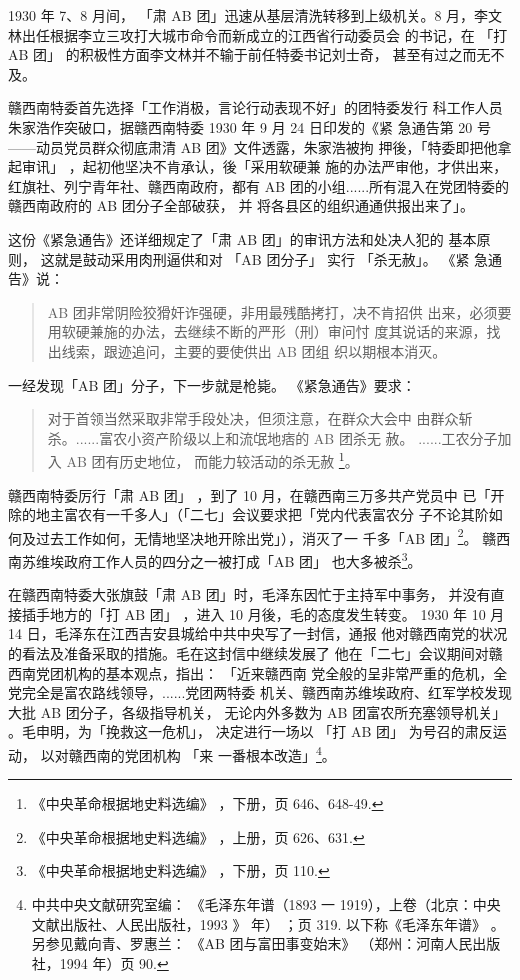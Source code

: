 1930 年 7、8 月间，
「肃 AB 团」迅速从基层清洗转移到上级机关。8
月，李文林出任根据李立三攻打大城市命令而新成立的江西省行动委员会
的书记，在 「打 AB 团」
的积极性方面李文林并不输于前任特委书记刘士奇，
甚至有过之而无不及。

赣西南特委首先选择「工作消极，言论行动表现不好」的团特委发行
科工作人员朱家浩作突破口，据赣西南特委 1930 年 9 月 24 日印发的《紧
急通告第 20 号——动员党员群众彻底肃清 AB 团》文件透露，朱家浩被拘
押後，「特委即把他拿起审讯」
，起初他坚决不肯承认，後「采用软硬兼
施的办法严审他，才供出来，红旗社、列宁青年社、赣西南政府，都有 AB
团的小组......所有混入在党团特委的赣西南政府的 AB 团分子全部破获，
并
将各县区的组织通通供报出来了」。

这份《紧急通告》还详细规定了「肃 AB 团」的审讯方法和处决人犯的
基本原则，
这就是鼓动采用肉刑逼供和对
「AB 团分子」
实行
「杀无赦」。
《紧
急通告》说：
\begin{quote}
	\fzwkai AB 团非常阴险狡猾奸诈强硬，非用最残酷拷打，决不肯招供
出来，必须要用软硬兼施的办法，去继续不断的严形（刑）审问忖
度其说话的来源，找出线索，跟迹追问，主要的要使供出 AB 团组
织以期根本消灭。
\end{quote}
一经发现「AB 团」分子，下一步就是枪毙。
《紧急通告》要求：
\begin{quote}
	\fzwkai 
对于首领当然采取非常手段处决，但须注意，在群众大会中
由群众斩杀。......富农小资产阶级以上和流氓地痞的 AB 团杀无
赦。
......工农分子加入 AB 团有历史地位，
而能力较活动的杀无赦
\footnote{ 《中央革命根据地史料选编》
，下册，页 646、648-49.}。
\end{quote}


赣西南特委厉行「肃 AB 团」
，到了 10 月，在赣西南三万多共产党员中
已「开除的地主富农有一千多人」（「二七」会议要求把「党内代表富农分
子不论其阶如何及过去工作如何，无情地坚决地开除出党」），消灭了一
千多「AB 团」\footnote{ 《中央革命根据地史料选编》
，上册，页 626、631.}。 赣西南苏维埃政府工作人员的四分之一被打成「AB 团」
也大多被杀\footnote{ 《中央革命根据地史料选编》
，下册，页 110.}。

在赣西南特委大张旗鼓「肃 AB 团」时，毛泽东因忙于主持军中事务，
并没有直接插手地方的「打 AB 团」
，进入 10 月後，毛的态度发生转变。
1930 年 10 月 14 日，毛泽东在江西吉安县城给中共中央写了一封信，通报
他对赣西南党的状况的看法及准备采取的措施。毛在这封信中继续发展了
他在「二七」会议期间对赣西南党团机构的基本观点，指出：
「近来赣西南
党全般的呈非常严重的危机，全党完全是富农路线领导，......党团两特委
机关、赣西南苏维埃政府、红军学校发现大批 AB 团分子，各级指导机关，
无论内外多数为 AB 团富农所充塞领导机关」 。毛申明，为「挽救这一危机」，
决定进行一场以
「打 AB 团」
为号召的肃反运动，
以对赣西南的党团机构
「来
一番根本改造」\footnote{ 中共中央文献研究室编：
《毛泽东年谱（1893 一 1919），上卷（北京：中央文献出版社、人民出版社，1993
》
年）
；页 319. 以下称《毛泽东年谱》
。另参见戴向青、罗惠兰：
《AB 团与富田事变始末》
（郑州：河南人民出版社，1994
年）页 90. 
}。

